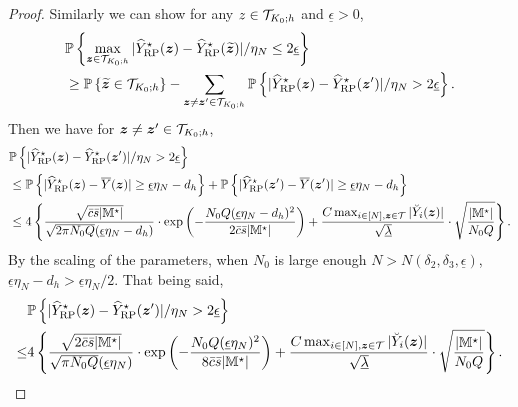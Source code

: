 \documentclass[12pt]{article}
\begin{document}
\begin{proof}
Similarly we can show for any $z\in{\mathcal{T}}_{K_0;h}$ and $\underline{\epsilon}>0$,
\begin{align*} 
    &{\mathbb{P}}\left\{\max_{{\boldsymbol{z}}\in{\mathcal{T}}_{K_0;h}}|{\widehat{Y}}^\star_{\operatorname{RP}}({\boldsymbol{z}}) - {\widehat{Y}}^\star_{\operatorname{RP}}(\widetilde{{\boldsymbol{z}}})|/\eta_N \le 2\underline{\epsilon}\right\} \\
    & \ge {\mathbb{P}}\left\{\widetilde{{\boldsymbol{z}}}\in{\mathcal{T}}_{K_0;h}\right\}  
     - \sum_{{\boldsymbol{z}}\neq {\boldsymbol{z}}'\in{\mathcal{T}}_{K_0;h}}{\mathbb{P}}\left\{|{\widehat{Y}}^\star_{\operatorname{RP}}({\boldsymbol{z}}) - {\widehat{Y}}^\star_{\operatorname{RP}}({{\boldsymbol{z}}'})|/\eta_N > 2\underline{\epsilon}\right\}.\notag
\end{align*}
Then we have for ${\boldsymbol{z}}\neq {\boldsymbol{z}}'\in{\mathcal{T}}_{K_0;h}$,
\begin{align*}
    &{\mathbb{P}}\left\{|{\widehat{Y}}^\star_{\operatorname{RP}}({\boldsymbol{z}}) - {\widehat{Y}}^\star_{\operatorname{RP}}({{\boldsymbol{z}}'})|/\eta_N > 2\underline{\epsilon}\right\} \\
    & \le {\mathbb{P}}\left\{|{\widehat{Y}}^\star_{\operatorname{RP}}({\boldsymbol{z}})-\overline{Y}({\boldsymbol{z}})|\ge  {\underline{\epsilon}\eta_N - d_h}   \right\} + {\mathbb{P}}\left\{|{\widehat{Y}}^\star_{\operatorname{RP}}({\boldsymbol{z}}') - \overline{Y}({{\boldsymbol{z}}'})|\ge  {\underline{\epsilon}\eta_N - d_h}   \right\}\\
    &\le 4\left\{ \frac{\sqrt{\bar{c}\bar{s}|{\mathbb{M}}^\star|}}{\sqrt{2\pi N_0Q }({\underline{\epsilon}\eta_N - d_h})}\cdot \exp\left(-\frac{ N_0Q ({\underline{\epsilon}\eta_N - d_h})^{  2}}{2\bar{c}\bar{s}|{\mathbb{M}}^\star|}\right)
    +  \frac{C \max_{i\in[N],{\boldsymbol{z}}\in{\mathcal{T}}}|\breve{Y}_i({\boldsymbol{z}})| }{\sqrt{\underline{\lambda}}}\cdot \sqrt{\frac{|{\mathbb{M}}^\star|}{N_0Q}}\right\}.
\end{align*}
By the scaling of the parameters, when $N_0$ is large enough $N>N(\delta_2,\delta_3,\underline{\epsilon})$, $\underline{\epsilon}\eta_N-d_h >\underline{\epsilon}\eta_N/2$. That being said,
\begin{align*}
    &{\mathbb{P}}\left\{|{\widehat{Y}}^\star_{\operatorname{RP}}({\boldsymbol{z}}) - {\widehat{Y}}^\star_{\operatorname{RP}}({{\boldsymbol{z}}'})|/\eta_N > 2\underline{\epsilon}\right\} \\
    \le & 4\left\{ \frac{\sqrt{2\bar{c}\bar{s} |{\mathbb{M}}^\star|}}{\sqrt{\pi N_0Q }({\underline{\epsilon}\eta_N})}\cdot \exp\left(-\frac{ N_0Q ({\underline{\epsilon}\eta_N})^{  2}}{8\bar{c}\bar{s} |{\mathbb{M}}^\star|}\right)
    +  \frac{C \max_{i\in[N],{\boldsymbol{z}}\in{\mathcal{T}}}|\breve{Y}_i({\boldsymbol{z}})| }{\sqrt{\underline{\lambda}}}\cdot \sqrt{\frac{|{\mathbb{M}}^\star|}{N_0Q}}\right\}.
\end{align*}


\end{proof}
\end{document}
